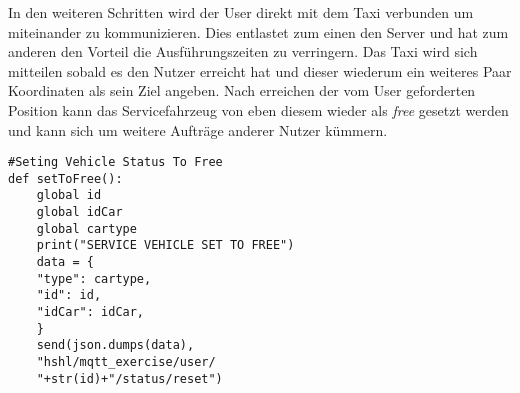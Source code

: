 In den weiteren Schritten wird der User direkt mit dem Taxi verbunden um miteinander zu kommunizieren. Dies entlastet zum einen den Server und hat zum anderen den Vorteil die Ausführungszeiten zu verringern. Das Taxi wird sich mitteilen sobald es den Nutzer erreicht hat und dieser wiederum ein weiteres Paar Koordinaten als sein Ziel angeben. Nach erreichen der vom User geforderten Position kann das Servicefahrzeug von eben diesem wieder als \textit{free} gesetzt werden und kann sich um weitere Aufträge anderer Nutzer kümmern.

\begin{lstlisting}
#Seting Vehicle Status To Free
def setToFree():
    global id
    global idCar
    global cartype
    print("SERVICE VEHICLE SET TO FREE")
    data = {
    "type": cartype,
    "id": id,
    "idCar": idCar,
    }
    send(json.dumps(data),
    "hshl/mqtt_exercise/user/
    "+str(id)+"/status/reset")
\end{lstlisting}

